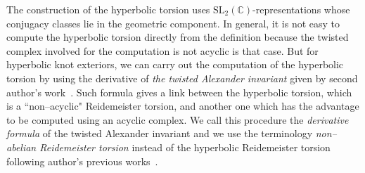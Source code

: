 \documentclass[a4paper]{amsart}
\theoremstyle{plain}
\theoremstyle{definition}
\theoremstyle{remark}
\newcommand{\CC}{{\mathbb C}}
\newcommand{\SL}{{\mathrm{SL}_2(\CC)}}
\begin{document}
The construction of the hyperbolic torsion uses $\SL$-representations
whose conjugacy classes lie in the geometric component.
In general, it is not easy to compute the hyperbolic torsion directly from the definition because the twisted complex involved for the computation is not acyclic is that case.
But for hyperbolic knot exteriors, we can carry out the computation of the 
hyperbolic torsion by using the derivative of {\it the twisted Alexander invariant}
given by second author's work~\cite{YY:Fourier}. Such formula gives a link between the hyperbolic torsion, which is a ``non--acyclic" Reidemeister torsion, and another one which has the advantage to be computed using an acyclic complex. 
We call this procedure the {\it derivative formula} of the twisted Alexander invariant
and we use the terminology {\it non--abelian Reidemeister torsion} instead of the hyperbolic Reidemeister torsion
following author's previous works~\cite{JDFourier, DuboisVuYam09:RTorsionTwistKnots}.
\end{document}
